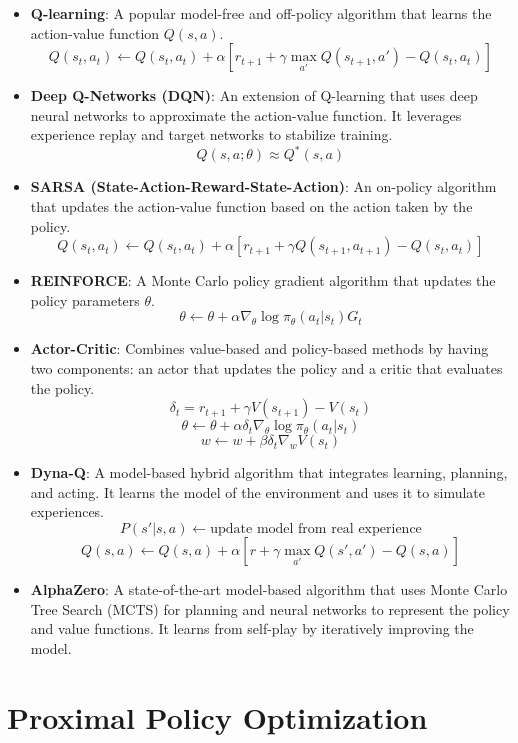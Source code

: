 \begin{itemize}
    \item \textbf{Q-learning}: A popular model-free and off-policy algorithm that learns the action-value function $Q(s, a)$.
    \[
    Q(s_t, a_t) \leftarrow Q(s_t, a_t) + \alpha \left[ r_{t+1} + \gamma \max_{a'} Q(s_{t+1}, a') - Q(s_t, a_t) \right]
    \]
    \item \textbf{Deep Q-Networks (DQN)}: An extension of Q-learning that uses deep neural networks to approximate the action-value function. It leverages experience replay and target networks to stabilize training.
    \[
    Q(s, a; \theta) \approx Q^*(s, a)
    \]
    \item \textbf{SARSA (State-Action-Reward-State-Action)}: An on-policy algorithm that updates the action-value function based on the action taken by the policy.
    \[
    Q(s_t, a_t) \leftarrow Q(s_t, a_t) + \alpha \left[ r_{t+1} + \gamma Q(s_{t+1}, a_{t+1}) - Q(s_t, a_t) \right]
    \]
    \item \textbf{REINFORCE}: A Monte Carlo policy gradient algorithm that updates the policy parameters $\theta$.
    \[
    \theta \leftarrow \theta + \alpha \nabla_{\theta} \log \pi_{\theta}(a_t|s_t) G_t
    \]
    \item \textbf{Actor-Critic}: Combines value-based and policy-based methods by having two components: an actor that updates the policy and a critic that evaluates the policy.
    \[
    \delta_t = r_{t+1} + \gamma V(s_{t+1}) - V(s_t)
    \]
    \[
    \theta \leftarrow \theta + \alpha \delta_t \nabla_{\theta} \log \pi_{\theta}(a_t|s_t)
    \]
    \[
    w \leftarrow w + \beta \delta_t \nabla_w V(s_t)
    \]
    \item \textbf{Dyna-Q}: A model-based hybrid algorithm that integrates learning, planning, and acting. It learns the model of the environment and uses it to simulate experiences.
    \[
    P(s'|s,a) \leftarrow \text{update model from real experience}
    \]
    \[
    Q(s, a) \leftarrow Q(s, a) + \alpha \left[ r + \gamma \max_{a'} Q(s', a') - Q(s, a) \right]
    \]
    \item \textbf{AlphaZero}: A state-of-the-art model-based algorithm that uses Monte Carlo Tree Search (MCTS) for planning and neural networks to represent the policy and value functions. It learns from self-play by iteratively improving the model.
\end{itemize}

\section{Proximal Policy Optimization}

